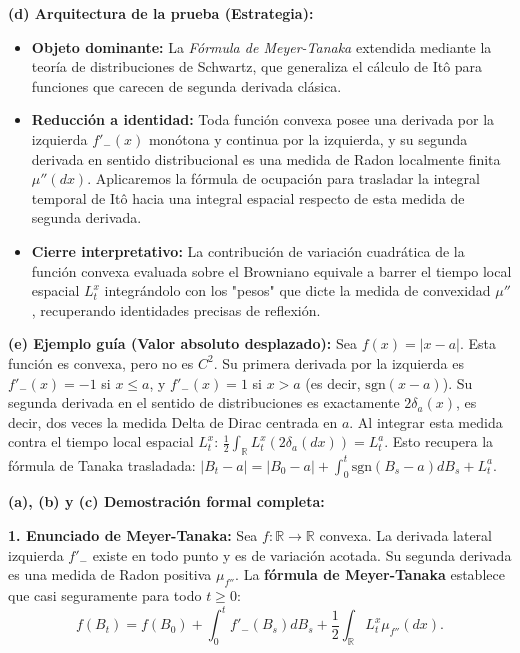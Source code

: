 \documentclass[11pt, letterpaper]{article}
\begin{document}
\vspace{5mm}

\begin{solucion}
    \textbf{(d) Arquitectura de la prueba (Estrategia):}
    \begin{itemize}
        \item[(i)] \textbf{Objeto dominante:} La \textit{Fórmula de Meyer-Tanaka} extendida mediante la teoría de distribuciones de Schwartz, que generaliza el cálculo de Itô para funciones que carecen de segunda derivada clásica.
        \item[(ii)] \textbf{Reducción a identidad:} Toda función convexa posee una derivada por la izquierda $f'_-(x)$ monótona y continua por la izquierda, y su segunda derivada en sentido distribucional es una medida de Radon localmente finita $\mu''(dx)$. Aplicaremos la fórmula de ocupación para trasladar la integral temporal de Itô hacia una integral espacial respecto de esta medida de segunda derivada.
        \item[(iii)] \textbf{Cierre interpretativo:} La contribución de variación cuadrática de la función convexa evaluada sobre el Browniano equivale a barrer el tiempo local espacial $L_t^x$ integrándolo con los "pesos" que dicte la medida de convexidad $\mu''$, recuperando identidades precisas de reflexión.
    \end{itemize}

    \vspace{3mm}
    \textbf{(e) Ejemplo guía (Valor absoluto desplazado):}
    Sea $f(x) = |x-a|$. Esta función es convexa, pero no es $C^2$. Su primera derivada por la izquierda es $f'_-(x) = -1$ si $x \le a$, y $f'_-(x) = 1$ si $x > a$ (es decir, $\text{sgn}(x-a)$).
    Su segunda derivada en el sentido de distribuciones es exactamente $2\delta_a(x)$, es decir, dos veces la medida Delta de Dirac centrada en $a$.
    Al integrar esta medida contra el tiempo local espacial $L_t^x$: $\frac{1}{2} \int_{\mathbb{R}} L_t^x (2\delta_a(dx)) = L_t^a$.
    Esto recupera la fórmula de Tanaka trasladada: $|B_t - a| = |B_0 - a| + \int_0^t \text{sgn}(B_s - a) dB_s + L_t^a$.

    \textbf{(a), (b) y (c) Demostración formal completa:}

    \textbf{1. Enunciado de Meyer-Tanaka:}
    Sea $f: \mathbb{R} \to \mathbb{R}$ convexa. La derivada lateral izquierda $f'_-$ existe en todo punto y es de variación acotada. Su segunda derivada es una medida de Radon positiva $\mu_{f''}$.
    La \textbf{fórmula de Meyer-Tanaka} establece que casi seguramente para todo $t \ge 0$:
    \[ f(B_t) = f(B_0) + \int_0^t f'_-(B_s) dB_s + \frac{1}{2} \int_{\mathbb{R}} L_t^x \mu_{f''}(dx). \]


\end{solucion}
\end{document}
